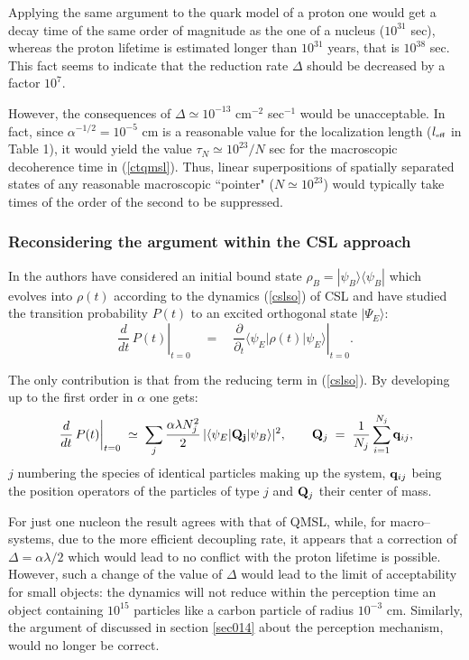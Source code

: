 \documentclass[10pt,a4paper]{article}
\begin{document}
Applying the same argument to the quark model of a proton one would
get a decay time of the same order of magnitude as the one of a
nucleus ($10^{31}$ sec), whereas the proton lifetime is estimated
longer than $10^{31}$ years, that is $10^{38}$ sec.
This fact seems to indicate that the reduction rate $\Delta$
should be decreased by a factor $10^{7}$.

However, the consequences of $\Delta \simeq 10^{-13}$ cm$^{-2}$
sec$^{-1}$ would be unacceptable. In fact, since $\alpha^{-1/2} =
10^{-5}$ cm is a reasonable value for the localization length
($l_{\makebox{\tiny eff}}$ in Table 1), it would yield the value
$\tau_{N} \simeq 10^{23}/N$ sec for the macroscopic decoherence
time in (\ref{ctqmsl}). Thus, linear superpositions of spatially
separated states of any reasonable macroscopic ``pointer" ($N
\simeq 10^{23}$) would typically take times of the order of the
second to be suppressed.

\subsubsection{Reconsidering the argument within the CSL approach}
\label{sec1531}

In \cite{pes} the authors have considered an initial bound state
$\rho_{B} = |\psi_{B}\rangle\langle\psi_{B}|$ which evolves into
$\rho(t)$ according to the dynamics (\ref{cslso}) of CSL and have
studied the transition probability $P(t)$ to an excited orthogonal
state $|\Psi_{E}\rangle$:
\begin{equation}
\left.\frac{d}{dt}\, P(t)\right|_{t = 0} \quad = \quad \left.
\frac{\partial}{\partial_{t}} \langle \psi_{E} | \rho(t)
|\psi_{E}\rangle \right|_{t = 0}.
\end{equation}

The only contribution is that from the reducing term in
(\ref{cslso}). By developing up to the first order in $\alpha$ one gets:
\begin{equation} \label{davs}
\left. \frac{d}{dt}\, P(t) \right|_{t = 0} \; \simeq \; \sum_{j}
\frac{\alpha\lambda N_{j}^{2}}{2}\, |\langle \psi_{E} | {\bf
Q_{j}} | \psi_{B} \rangle |^{2}, \qquad {\bf Q}_{j} \;  = \;
\frac{1}{N_{j}} \sum_{i = 1}^{N_{j}} {\bf q}_{ij},
\end{equation}
$j$ numbering the species of identical particles making up the
system, ${\bf q}_{ij}$ being the position operators of the  particles of
type $j$ and ${\bf Q}_{j}$ their center of mass.

For just one nucleon the result agrees with that of QMSL, while,
for macro--systems, due to the more efficient decoupling rate, it
appears that a correction of $\Delta = \alpha\lambda/2$ which
would lead to no conflict with the proton lifetime is possible.
However, such a change of the value of $\Delta$ would lead  to
the limit of acceptability for small objects: the dynamics will
not reduce within the perception time an object containing
$10^{15}$ particles like a carbon particle of radius $10^{-3}$ cm.
Similarly, the argument of \cite{abp} discussed in section
\ref{sec014} about the perception mechanism, would no longer be
correct.
\end{document}
